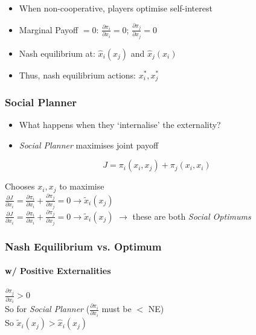 \documentclass[11pt, english]{article}
\begin{document}
	\begin{itemize}
	\setlength\itemsep{0cm}
		\item When non-cooperative, players optimise self-interest
		\item Marginal Payoff $=0$: $\frac{\partial \pi_i}{\partial x_i}=0$; $\frac{\partial \pi_j}{\partial x_j}=0$
		\item Nash equilibrium at: ${\hat{x}}_i\left(x_j\right)$ and ${\hat{x}}_j(x_i)$
		\item Thus, nash equilibrium actions: $x_i^\ast,x_j^\ast$
	\end{itemize}

		\subsubsection{Social Planner}

	\begin{itemize}
	\setlength\itemsep{0cm}
		\item What happens when they `internalise' the externality?
		\item \textit{Social Planner} maximises joint payoff
	\end{itemize}

	$$J=\pi_i\left(x_i,x_j\right)+\pi_j\left(x_i,x_i\right)$$

	Chooses $x_i,x_j$ to maximise\\
	$\frac{\partial J}{\partial x_i}=\frac{\partial \pi_i}{\partial x_i}+\frac{\partial \pi_j}{\partial x_j}=0\rightarrow{\widetilde{x}}_i(x_j)$\\
	$\frac{\partial J}{\partial x_i}=\frac{\partial \pi_i}{\partial x_i}+\frac{\partial \pi_j}{\partial x_j}=0\rightarrow{\widetilde{x}}_i\left(x_j\right)$ $\rightarrow$ these are both \textit{Social Optimums}

		\subsubsection{Nash Equilibrium vs. Optimum}

		\paragraph{w/ Positive Externalities}

	$\frac{\partial \pi_j}{\partial x_i}>0$\\
	So for \textit{Social Planner} ($\frac{\partial \pi_i}{\partial x_i}$ must be $<$ NE)\\
	So ${\widetilde{x}}_i\left(x_j\right)>{\hat{x}}_i\left(x_j\right)$
\end{document}
